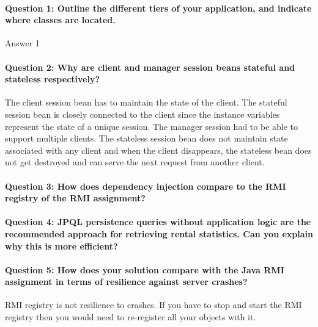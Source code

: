 \documentclass{ds-report}
\begin{document}
	\maketitle

	\paragraph{Question 1: Outline the different tiers of your application, and indicate where classes are located.\\} 
	Answer 1
	
	\paragraph{Question 2: Why are client and manager session beans stateful and stateless respectively?\\} 
	The client session bean has to maintain the state of the client. The stateful session bean is closely connected to the client since the instance variables represent the state of a unique session. 
	The manager session had to be able to support multiple clients. 
	The stateless session bean does not maintain state associated with any client and when the client disappears, the stateless bean does not get destroyed and can serve the next request from another client.
	\paragraph{Question 3: How does dependency injection compare to the RMI registry of the RMI assignment?\\} 
	
	\paragraph{Question 4: JPQL persistence queries without application logic are the recommended approach for retrieving rental statistics. Can you explain why this is more efficient?\\} 
	
	
	\paragraph{Question 5: How does your solution compare with the Java RMI assignment in terms of resilience against server crashes?\\} 
	RMI registry is not resilience to crashes. If you have to stop and start the RMI registry then you would need to re-register all your objects with it.
	
\end{document}

